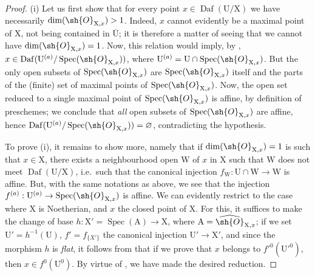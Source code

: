 \begin{proof}
(i) Let us first show that for every point $x\in\operatorname{Daf}(\mathrm{U}/\mathrm{X})$ we have necessarily $\dim(\sh{O}_{\mathrm{X},x})>1$.
Indeed, $x$ cannot evidently be a maximal point of $\mathrm{X}$, not being contained in $\overline{\mathrm{U}}$; it is therefore a matter of seeing that we cannot have $\dim(\sh{O}_{\mathrm{X},x})=1$.
Now, this relation would imply, by , $x\in\operatorname{Daf}(\mathrm{U}^{(a)}/\operatorname{Spec}(\sh{O}_{\mathrm{X},x}))$, where $\mathrm{U}^{(a)}=\mathrm{U}\cap\operatorname{Spec}(\sh{O}_{\mathrm{X},x})$.
But the only open subsets of $\operatorname{Spec}(\sh{O}_{\mathrm{X},x})$ are $\operatorname{Spec}(\sh{O}_{\mathrm{X},x})$ itself and the parts of the (finite) set of maximal points of $\operatorname{Spec}(\sh{O}_{\mathrm{X},x})$.
Now, the open set reduced to a single maximal point of $\operatorname{Spec}(\sh{O}_{\mathrm{X},x})$ is affine, by definition of preschemes; we conclude that \emph{all} open subsets of $\operatorname{Spec}(\sh{O}_{\mathrm{X},x})$ are affine, hence $\operatorname{Daf}(\mathrm{U}^{(a)}/\operatorname{Spec}(\sh{O}_{\mathrm{X},x}))=\varnothing$, contradicting the hypothesis.

To prove (i), it remains to show more, namely that if $\dim(\sh{O}_{\mathrm{X},x})=1$ is such that $x\in\mathrm{X}$, there exists a neighbourhood open $\mathrm{W}$ of $x$ in $\mathrm{X}$ such that $\mathrm{W}$ does not meet $\operatorname{Daf}(\mathrm{U}/\mathrm{X})$, i.e.\ such that the canonical injection $f_{\mathrm{W}}:\mathrm{U}\cap\mathrm{W}\to\mathrm{W}$ is affine.
But, with the same notations as above, we see that the injection $f^{(a)}:\mathrm{U}^{(a)}\to\operatorname{Spec}(\sh{O}_{\mathrm{X},x})$ is affine.
We can evidently restrict to the case where $\mathrm{X}$ is Noetherian, and $x$ the closed point of $\mathrm{X}$.
For this, it suffices to make the change of base $h:\mathrm{X}'=\operatorname{Spec}(\mathrm{A})\to\mathrm{X}$, where $\mathrm{A}=\widehat{\sh{O}}_{\mathrm{X},x}$; if we set $\mathrm{U}'=h^{-1}(\mathrm{U})$, $f'=f_{\{X'\}}$ the canonical injection $\mathrm{U}'\to\mathrm{X}'$, and since the morphism $h$ is \emph{flat}, it follows from  that if we prove that $x$ belongs to $f'^0(\mathrm{U}'^0)$, then $x\in f^0(\mathrm{U}^0)$.
By virtue of , we have made the desired reduction.


\end{proof}
